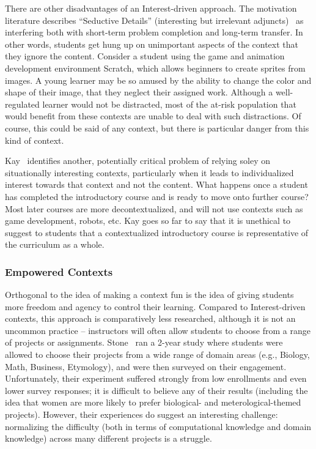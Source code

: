 There are other disadvantages of an Interest-driven approach.
The motivation literature describes ``Seductive Details'' (interesting but irrelevant adjuncts)~\cite{harp1998seductive} as interfering both with short-term problem completion and long-term transfer.
In other words, students get hung up on unimportant aspects of the context that they ignore the content.
Consider a student using the game and animation development environment Scratch, which allows beginners to create sprites from images.
A young learner may be so amused by the ability to change the color and shape of their image, that they neglect their assigned work.
Although a well-regulated learner would not be distracted, most of the at-risk population that would benefit from these contexts are unable to deal with such distractions.
Of course, this could be said of any context, but there is particular danger from this kind of context.

Kay~\cite{Kay:2011} identifies another, potentially critical problem of relying soley on situationally interesting contexts, particularly when it leads to individualized interest towards that context and not the content. 
What happens once a student has completed the introductory course and is ready to move onto further course?
Most later courses are more decontextualized, and will not use contexts such as game development, robots, etc.
Kay goes so far to say that it is unethical to suggest to students that a contextualized introductory course is representative of the curriculum as a whole.

\subsubsection{Empowered Contexts}

Orthogonal to the idea of making a context fun is the idea of giving students more freedom and agency to control their learning.
Compared to Interest-driven contexts, this approach is comparatively less researched, although it is not an uncommon practice -- instructors will often allow students to choose from a range of projects or assignments.
Stone~\cite{EmpowermentInProjects} ran a 2-year study where students were allowed to choose their projects from a wide range of domain areas (e.g., Biology, Math, Business, Etymology), and were then surveyed on their engagement.
Unfortunately, their experiment suffered strongly from low enrollments and even lower survey responses; it is difficult to believe any of their results (including the idea that women are more likely to prefer biological- and meterological-themed projects).
However, their experiences do suggest an interesting challenge: normalizing the difficulty (both in terms of computational knowledge and domain knowledge) across many different projects is a struggle.

